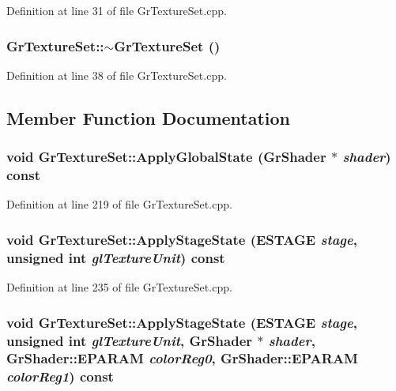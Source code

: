 Definition at line 31 of file GrTextureSet.cpp.\hypertarget{class_gr_texture_set_bcff7abdf78142bf14d6a668a4ceb938}{
\subsubsection[{$\sim$GrTextureSet}]{\setlength{\rightskip}{0pt plus 5cm}GrTextureSet::$\sim$GrTextureSet ()}}
\label{class_gr_texture_set_bcff7abdf78142bf14d6a668a4ceb938}




Definition at line 38 of file GrTextureSet.cpp.

\subsection{Member Function Documentation}
\hypertarget{class_gr_texture_set_974058b8d0d8f04b85807f52ae857a63}{
\subsubsection[{ApplyGlobalState}]{\setlength{\rightskip}{0pt plus 5cm}void GrTextureSet::ApplyGlobalState ({\bf GrShader} $\ast$ {\em shader}) const}}
\label{class_gr_texture_set_974058b8d0d8f04b85807f52ae857a63}




Definition at line 219 of file GrTextureSet.cpp.\hypertarget{class_gr_texture_set_32fe958b51b47d431ee66cd72702a40e}{
\subsubsection[{ApplyStageState}]{\setlength{\rightskip}{0pt plus 5cm}void GrTextureSet::ApplyStageState ({\bf ESTAGE} {\em stage}, \/  unsigned int {\em glTextureUnit}) const}}
\label{class_gr_texture_set_32fe958b51b47d431ee66cd72702a40e}




Definition at line 235 of file GrTextureSet.cpp.\hypertarget{class_gr_texture_set_e3e1bfc4506ef8333d5ef947f8d7b391}{
\subsubsection[{ApplyStageState}]{\setlength{\rightskip}{0pt plus 5cm}void GrTextureSet::ApplyStageState ({\bf ESTAGE} {\em stage}, \/  unsigned int {\em glTextureUnit}, \/  {\bf GrShader} $\ast$ {\em shader}, \/  {\bf GrShader::EPARAM} {\em colorReg0}, \/  {\bf GrShader::EPARAM} {\em colorReg1}) const}}
\label{class_gr_texture_set_e3e1bfc4506ef8333d5ef947f8d7b391}




